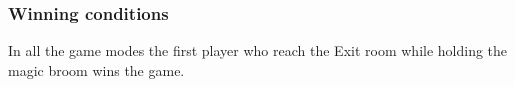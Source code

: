 \subsubsection{Winning conditions}
In all the game modes the first player who reach the Exit room while holding the magic broom wins the game.
